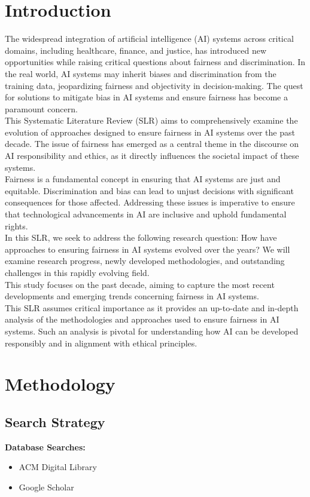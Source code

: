 \documentclass{article}
\begin{document}
\section{Introduction}
The widespread integration of artificial intelligence (AI) systems across critical domains, including healthcare, finance, and justice, has introduced new opportunities while raising critical questions about fairness and discrimination. In the real world, AI systems may inherit biases and discrimination from the training data, jeopardizing fairness and objectivity in decision-making. The quest for solutions to mitigate bias in AI systems and ensure fairness has become a paramount concern. \\
This Systematic Literature Review (SLR) aims to comprehensively examine the evolution of approaches designed to ensure fairness in AI systems over the past decade. The issue of fairness has emerged as a central theme in the discourse on AI responsibility and ethics, as it directly influences the societal impact of these systems. \\
Fairness is a fundamental concept in ensuring that AI systems are just and equitable. Discrimination and bias can lead to unjust decisions with significant consequences for those affected. Addressing these issues is imperative to ensure that technological advancements in AI are inclusive and uphold fundamental rights. \\
In this SLR, we seek to address the following research question: How have approaches to ensuring fairness in AI systems evolved over the years? We will examine research progress, newly developed methodologies, and outstanding challenges in this rapidly evolving field. \\
This study focuses on the past decade, aiming to capture the most recent developments and emerging trends concerning fairness in AI systems. \\
This SLR assumes critical importance as it provides an up-to-date and in-depth analysis of the methodologies and approaches used to ensure fairness in AI systems. Such an analysis is pivotal for understanding how AI can be developed responsibly and in alignment with ethical principles.

\newpage
\section{Methodology}
    \subsection{Search Strategy}
    \textbf{Database Searches:}
\begin{itemize}
    \item ACM Digital Library
    \item Google Scholar
\end{itemize}
\end{document}
